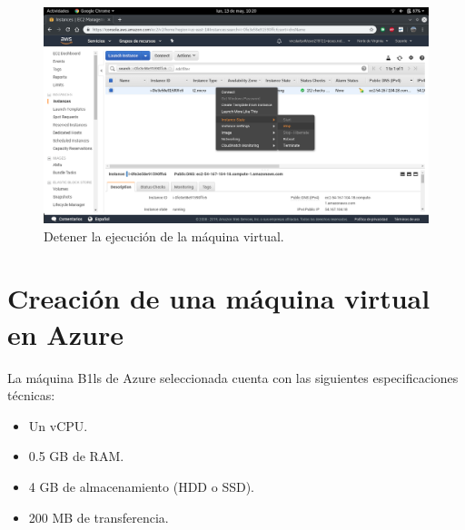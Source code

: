 \begin{enumerate}
\begin{figure}[h]
		\centering
		\includegraphics[scale=0.28]{ImagenesAWS/19.png}
		\caption{Detener la ejecución de la máquina virtual.}
		\label{Detener la ejecución de la máquina virtual}
	\end{figure}
\end{enumerate}

\newpage
\section{Creación de una máquina virtual en Azure}
La máquina B1ls de Azure seleccionada cuenta con las siguientes especificaciones técnicas:
\begin{itemize}
	\item Un vCPU.
	\item 0.5 GB de RAM.
	\item 4 GB de almacenamiento (HDD o SSD).
	\item 200 MB de transferencia.
\end{itemize}

